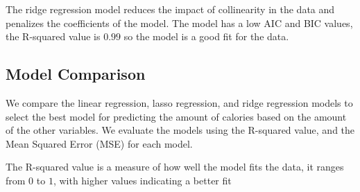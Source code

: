\documentclass[
]{article}
\newenvironment{Shaded}{\begin{snugshade}}{\end{snugshade}}
\newcommand{\AttributeTok}[1]{\textcolor[rgb]{0.13,0.29,0.53}{#1}}
\newcommand{\DecValTok}[1]{\textcolor[rgb]{0.00,0.00,0.81}{#1}}
\newcommand{\FunctionTok}[1]{\textcolor[rgb]{0.13,0.29,0.53}{\textbf{#1}}}
\newcommand{\NormalTok}[1]{#1}
\newcommand{\OtherTok}[1]{\textcolor[rgb]{0.56,0.35,0.01}{#1}}
\newcommand{\SpecialCharTok}[1]{\textcolor[rgb]{0.81,0.36,0.00}{\textbf{#1}}}
\newcommand{\StringTok}[1]{\textcolor[rgb]{0.31,0.60,0.02}{#1}}
\begin{document}
The ridge regression model reduces the impact of collinearity in the
data and penalizes the coefficients of the model. The model has a low
AIC and BIC values, the R-squared value is \(0.99\) so the model is a
good fit for the data.

\hypertarget{model-comparison}{%
\subsection{Model Comparison}\label{model-comparison}}

We compare the linear regression, lasso regression, and ridge regression
models to select the best model for predicting the amount of calories
based on the amount of the other variables. We evaluate the models using
the R-squared value, and the Mean Squared Error (MSE) for each model.

The R-squared value is a measure of how well the model fits the data, it
ranges from \(0\) to \(1\), with higher values indicating a better fit

\begin{Shaded}
\end{Shaded}
\end{document}
